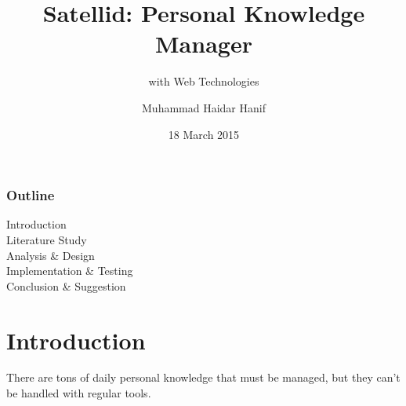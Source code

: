 \documentclass[10pt, compress]{beamer}
\title{Satellid: Personal Knowledge Manager}
\subtitle{with Web Technologies}
\date{18 March 2015}
\author{Muhammad Haidar Hanif}
\institute{Informatics Engineering - Gunadarma University}
\begin{document}

\maketitle


\begin{frame}[fragile]
  \frametitle{Outline}

  \begin{description}
    \item[Introduction]%
    \item[Literature Study]%
    \item[Analysis \& Design]%
    \item[Implementation \& Testing]%
    \item[Conclusion \& Suggestion]
  \end{description}

\end{frame}


\section{Introduction}


\begin{frame}[fragile]

  \begin{center}
  There are tons of \alert{daily personal knowledge} that must be managed,
  but they can't be handled with regular tools.
  \end{center}

\end{frame}

\end{document}
